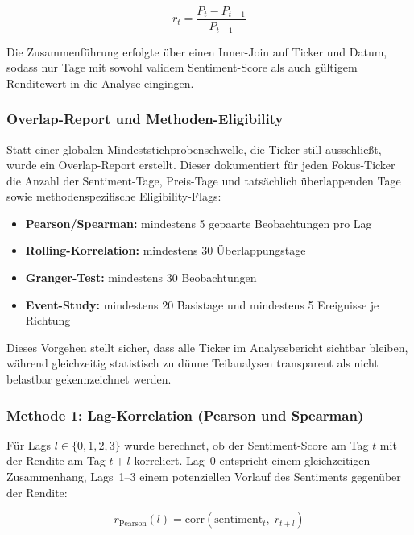 \begin{equation}
r_t = \frac{P_t - P_{t-1}}{P_{t-1}}
\label{eq:return}
\end{equation}

Die Zusammenführung erfolgte über einen Inner-Join auf Ticker und Datum, sodass nur Tage mit sowohl validem Sentiment-Score als auch gültigem Renditewert in die Analyse eingingen.

\subsubsection*{Overlap-Report und Methoden-Eligibility}

Statt einer globalen Mindeststichprobenschwelle, die Ticker still ausschließt, wurde ein Overlap-Report erstellt. Dieser dokumentiert für jeden Fokus-Ticker die Anzahl der Sentiment-Tage, Preis-Tage und tatsächlich überlappenden Tage sowie methodenspezifische Eligibility-Flags:

\begin{itemize}[noitemsep]
\item \textbf{Pearson/Spearman:} mindestens 5 gepaarte Beobachtungen pro Lag
\item \textbf{Rolling-Korrelation:} mindestens 30 Überlappungstage
\item \textbf{Granger-Test:} mindestens 30 Beobachtungen
\item \textbf{Event-Study:} mindestens 20 Basistage und mindestens 5 Ereignisse je Richtung
\end{itemize}

Dieses Vorgehen stellt sicher, dass alle Ticker im Analysebericht sichtbar bleiben, während gleichzeitig statistisch zu dünne Teilanalysen transparent als nicht belastbar gekennzeichnet werden.

\subsubsection*{Methode 1: Lag-Korrelation (Pearson und Spearman)}

Für Lags $l \in \{0, 1, 2, 3\}$ wurde berechnet, ob der Sentiment-Score am Tag $t$ mit der Rendite am Tag $t+l$ korreliert. Lag~0 entspricht einem gleichzeitigen Zusammenhang, Lags~1--3 einem potenziellen Vorlauf des Sentiments gegenüber der Rendite:

\begin{equation}
r_{\text{Pearson}}(l) = \text{corr}\!\left(\text{sentiment}_t,\; r_{t+l}\right)
\label{eq:pearson_lag}
\end{equation}

